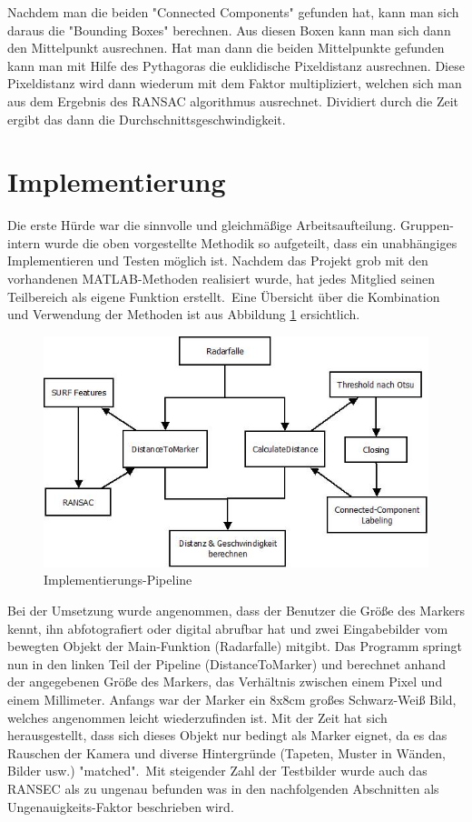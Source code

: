\documentclass[deutsch]{scrartcl}
\begin{document}
Nachdem man die beiden "Connected Components" gefunden hat, kann man sich daraus die "Bounding Boxes" berechnen. Aus diesen Boxen kann man sich dann den Mittelpunkt ausrechnen. Hat man dann die beiden Mittelpunkte gefunden kann man mit Hilfe des Pythagoras die euklidische Pixeldistanz ausrechnen. Diese Pixeldistanz wird dann wiederum mit dem Faktor multipliziert, welchen sich man aus dem Ergebnis des RANSAC algorithmus ausrechnet. Dividiert durch die Zeit ergibt das dann die Durchschnittsgeschwindigkeit.


\section{Implementierung}

Die erste Hürde war die sinnvolle und gleichmäßige Arbeitsaufteilung. Gruppen-intern wurde die oben vorgestellte Methodik so aufgeteilt, dass ein unabhängiges Implementieren  und Testen möglich ist. Nachdem das Projekt grob mit den vorhandenen MATLAB-Methoden realisiert wurde, hat jedes Mitglied seinen Teilbereich als eigene Funktion erstellt.\ 
Eine Übersicht über die Kombination und Verwendung der Methoden ist aus Abbildung \ref{fig:implPipeline} ersichtlich. 

\begin{figure}[h]
\centering
\includegraphics[scale=0.8]{Implementationspipeline}
\caption{Implementierungs-Pipeline}
\label{fig:implPipeline}
\end{figure}

Bei der Umsetzung wurde angenommen, dass der Benutzer die Größe des Markers kennt, ihn abfotografiert oder digital abrufbar hat und zwei Eingabebilder vom bewegten Objekt der Main-Funktion (Radarfalle) mitgibt. Das Programm springt nun in den linken Teil der Pipeline (DistanceToMarker) und berechnet anhand der angegebenen Größe des Markers, das Verhältnis zwischen einem Pixel und einem Millimeter. Anfangs war der Marker ein 8x8cm großes Schwarz-Weiß Bild, welches angenommen leicht wiederzufinden ist. Mit der Zeit hat sich herausgestellt, dass sich dieses Objekt nur bedingt als Marker eignet, da es das Rauschen der Kamera und diverse Hintergründe (Tapeten, Muster in Wänden, Bilder usw.) "matched".\
Mit steigender Zahl der Testbilder wurde auch das RANSEC als zu ungenau befunden was in den nachfolgenden Abschnitten als Ungenauigkeits-Faktor beschrieben wird.\
\end{document}

